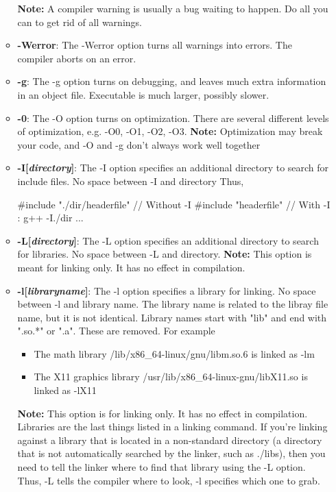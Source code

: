 \documentclass{report}
\begin{document}
\begin{itemize}
\begin{itemize}
                    \bigbreak \noindent 
                    \textbf{Note:} A compiler warning is usually a bug waiting to happen. Do all you can to get rid of all warnings.
                \item \textbf{-Werror}: The -Werror option turns all warnings into errors. The compiler aborts on an error.
                \item \textbf{-g}: The -g option turns on debugging, and leaves much extra information in an object file. Executable is much larger, possibly slower.
                \item \textbf{-0}: The -O option turns on optimization. There are several different levels of optimization, e.g. -O0, -O1, -O2, -O3. 
                    \bigbreak \noindent 
                    \textbf{Note:} Optimization may break your code, and -O and -g don't always work well together
                \item \textbf{-I[\textit{directory}]}: The -I option specifies an additional directory to search for include files. No space between -I and directory
                    \bigbreak \noindent 
                    Thus, 
                    \begin{cppcode}
                    #include "./dir/headerfile" // Without -I
                    #include "headerfile" // With -I : g++ -I./dir ...
                    \end{cppcode}
                \item \textbf{-L[\textit{directory}]}: The -L option specifies an additional directory to search for libraries. No space between -L and directory.
                    \bigbreak \noindent 
                    \textbf{Note:} This option is meant for linking only. It has no effect in compilation.
                \item \textbf{-l[\textit{libraryname}]}: The -l option specifies a library for linking. No space between -l and library name. The library name is related to the libray file name, but it is not identical. Library names start with "lib" and end with ".so.*" or ".a". These are removed. For example
                    \begin{itemize}
                        \item The math library /lib/x86\_64-linux/gnu/libm.so.6 is linked as -lm
                        \item The X11 graphics library /usr/lib/x86\_64-linux-gnu/libX11.so is linked as -lX11
                    \end{itemize}
                    \bigbreak \noindent 
                    \textbf{Note:} This option is for linking only. It has no effect in compilation.  Libraries are the last things listed in a linking command.
                    \bigbreak \noindent 
                    If you're linking against a library that is located in a non-standard directory (a directory that is not automatically searched by the linker, such as ./libs), then you need to tell the linker where to find that library using the -L option. Thus, -L tells the compiler  where to look, -l specifies which one to grab.


\end{itemize}
\end{itemize}
\end{document}
